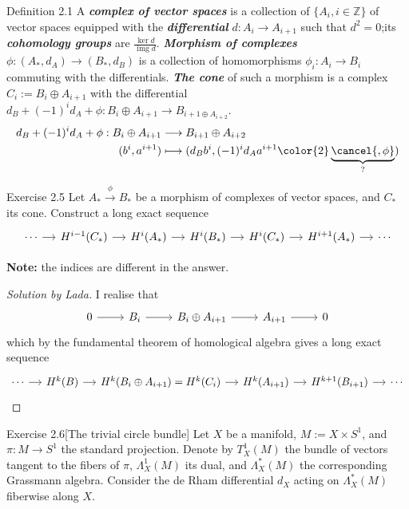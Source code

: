 \begin{thing3}{Definition 2.1}\label{def:2.1}\leavevmode
	A \textit{\textbf{complex of vector spaces}} is a collection of \(\{A_i,i \in \mathbb{Z}\}\) of vector spaces equipped with the \textit{\textbf{differential}} \(d:A_i\to A_{i+1}\) such that \(d^2=0\);its \textit{\textbf{cohomology groups}} are \(\frac{\ker d}{\operatorname{img}d}\). \textit{\textbf{Morphism of complexes}} \(\phi:(A_*,d_A)\to (B_*,d_B)\) is a collection of homomorphisms \(\phi_i:A_i\to B_i\) commuting with the differentials. \textit{\textbf{The cone}} of such a morphism is a complex \(C_i:=B_i \oplus A_{i+1}\) with the differential \(d_B+(-1)^id_A+\phi:B_i \oplus A_{i+1}\to B_{i+1\oplus A_{i+2}}\).
\begin{align*}
	d_B+(-1)^id_A+\phi:B_i\oplus A_{i+1} &\longrightarrow B_{i+1}\oplus A_{i+2} \\
	(b^i,a^{i+1}) &\longmapsto (d_B b^i, (-1)^i d_A a^{i+1}{\color{2}\underbrace{\cancel{, \phi}}_{?}})
\end{align*}

\begin{thing4}{Exercise 2.5}\label{exer:2.5}\leavevmode
Let \(A_* \xrightarrow{\phi}B_*\) be a morphism of complexes of vector spaces, and \(C_*\) its cone. Construct a long exact sequence
\[\begin{tikzcd}[column sep=small]
	\cdots\arrow[r]&H^{i-1}(C_*)\arrow[r]&H^{i}(A_*)\arrow[r]&H^{i}(B_*)\arrow[r]&H^{i}(C_*)\arrow[r]&H^{i+1}(A_*)\arrow[r]&\cdots
\end{tikzcd}\]

\textbf{Note:} the indices are different in the answer.
\end{thing4}

\begin{proof}[Solution by Lada]\leavevmode
I realise that
\[\begin{tikzcd}0\arrow[r]&B_i\arrow[r]&B_i \oplus  A_{i+1}\arrow[r]&A_{i+1}\arrow[r]&0\end{tikzcd}\]
which by the fundamental theorem of homological algebra gives a long exact sequence
\[\begin{tikzcd}[column sep=small]
	\cdots\arrow[r]&H^{k}(B)\arrow[r]&H^{k}(B_i \oplus  A_{i+1})=H^{k}(C_i)\arrow[r]&H^{k}(A_{i+1})\arrow[r]&H^{k+1}(B_{i+1})\arrow[r]&\cdots
\end{tikzcd}\]
\end{proof}

\begin{thing4}{Exercise 2.6}[The trivial circle bundle]\label{exer:2.6}\leavevmode
Let \(X\) be a manifold, \(M:=X \times S^1\), and \(\pi:M \to S^1\) the standard projection. Denote by \(T^1_X(M)\) the bundle of vectors tangent to the fibers of \(\pi\), \(\Lambda^{1}_X(M)\) its dual, and \(\Lambda^{*}_X(M)\) the corresponding Grassmann algebra. Consider the de Rham differential \(d_X\) acting on \(\Lambda^{*}_X(M)\) fiberwise along \(X\).


\end{thing4}
\end{thing3}
